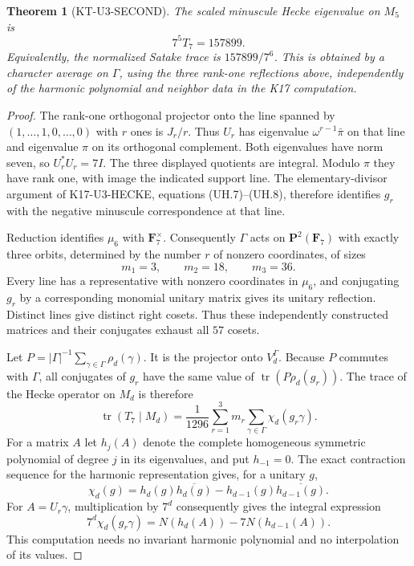 \documentclass[11pt,a4paper]{article}
\newtheorem{theorem}{Theorem}[section]
\theoremstyle{definition}
\begin{document}
\begin{theorem}[KT-U3-SECOND]
The scaled minuscule Hecke eigenvalue on $M_5$ is
\[
                         7^5T_7=157899.
\]
Equivalently, the normalized Satake trace is $157899/7^6$.
This is obtained by a character average on $\Gamma$, using the
three rank-one reflections above, independently of the harmonic
polynomial and neighbor data in the K17 computation.
\end{theorem}
\begin{proof}
The rank-one orthogonal projector onto the line spanned by
$(1,\ldots,1,0,\ldots,0)$ with $r$ ones is $J_r/r$.
Thus $U_r$ has eigenvalue $\omega^{r-1}\bar\pi$ on that line
and eigenvalue $\pi$ on its orthogonal complement.
Both eigenvalues have norm seven, so $U_r^*U_r=7I$.
The three displayed quotients are integral. Modulo $\pi$ they
have rank one, with image the indicated support line.
The elementary-divisor argument of K17-U3-HECKE, equations
(UH.7)--(UH.8), therefore identifies $g_r$ with the negative
minuscule correspondence at that line.

Reduction identifies $\mu_6$ with $\mathbf F_7^\times$.
Consequently $\Gamma$ acts on $\mathbf P^2(\mathbf F_7)$ with
exactly three orbits, determined by the number $r$ of nonzero
coordinates, of sizes
\[
             m_1=3,\qquad m_2=18,\qquad m_3=36.
\]
Every line has a representative with nonzero coordinates in
$\mu_6$, and conjugating $g_r$ by a corresponding monomial
unitary matrix gives its unitary reflection.
Distinct lines give distinct right cosets. Thus these independently
constructed matrices and their conjugates exhaust all $57$ cosets.

Let $P=|\Gamma|^{-1}\sum_{\gamma\in\Gamma}\rho_d(\gamma)$.
It is the projector onto $V_d^\Gamma$.
Because $P$ commutes with $\Gamma$, all conjugates of $g_r$ have
the same value of $\operatorname{tr}(P\rho_d(g_r))$.
The trace of the Hecke operator on $M_d$ is therefore
\[
 \operatorname{tr}(T_7\mid M_d)=
 \frac1{1296}\sum_{r=1}^3m_r
       \sum_{\gamma\in\Gamma}\chi_d(g_r\gamma).
\]
For a matrix $A$ let $h_j(A)$ denote the complete homogeneous
symmetric polynomial of degree $j$ in its eigenvalues, and put
$h_{-1}=0$.
The exact contraction sequence for the harmonic representation gives,
for a unitary $g$,
\[
 \chi_d(g)=h_d(g)\overline{h_d(g)}
                 -h_{d-1}(g)\overline{h_{d-1}(g)}.
\]
For $A=U_r\gamma$, multiplication by $7^d$ consequently gives
the integral expression
\[
       7^d\chi_d(g_r\gamma)
           =N(h_d(A))-7N(h_{d-1}(A)).                 \tag{KT-U.1}
\]
This computation needs no invariant harmonic polynomial and no
interpolation of its values.


\end{proof}
\end{document}
